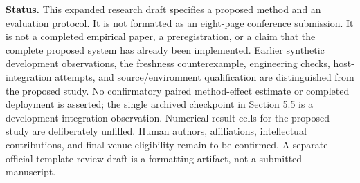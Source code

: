 \textbf{Status.} This expanded research draft specifies a proposed
method and an evaluation protocol. It is not formatted as an eight-page
conference submission. It is not a completed empirical paper, a
preregistration, or a claim that the complete proposed system has
already been implemented. Earlier synthetic development observations,
the freshness counterexample, engineering checks, host-integration
attempts, and source/environment qualification are distinguished from
the proposed study. No confirmatory paired method-effect estimate or
completed deployment is asserted; the single archived checkpoint in
Section 5.5 is a development integration observation. Numerical result
cells for the proposed study are deliberately unfilled. Human authors,
affiliations, intellectual contributions, and final venue eligibility
remain to be confirmed. A separate official-template review draft is a
formatting artifact, not a submitted manuscript.
